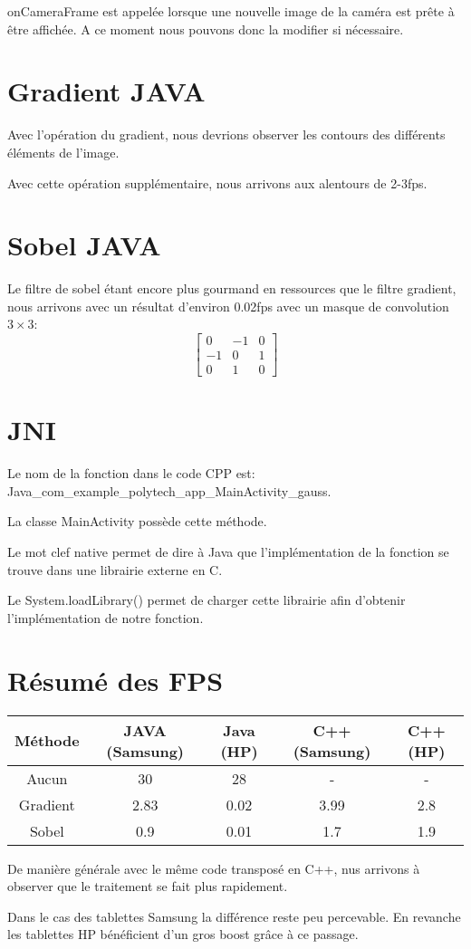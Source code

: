 \documentclass{report}
\begin{document}
				onCameraFrame est appelée lorsque une nouvelle image de la caméra est prête à être affichée.
				A ce moment nous pouvons donc la modifier si nécessaire.
		\section{Gradient JAVA}
			Avec l'opération du gradient, nous devrions observer les contours des différents éléments de l'image.
			
			Avec cette opération supplémentaire, nous arrivons aux alentours de 2-3fps.
			
		\section{Sobel JAVA}
			Le filtre de sobel étant encore plus gourmand en ressources que le filtre gradient, nous arrivons avec un résultat d'environ 0.02fps avec un masque de convolution $3\times 3$:
			$$\begin{bmatrix}
				0 & -1 & 0\\
				-1 & 0 & 1\\
				0 & 1 & 0
			\end{bmatrix}$$
		
		\section{JNI}
			Le nom de la fonction dans le code CPP est: Java\_com\_example\_polytech\_app\_MainActivity\_gauss.
			
			La classe MainActivity possède cette méthode.
			
			Le mot clef native permet de dire à Java que l'implémentation de la fonction se trouve dans une librairie externe en C.
			
			Le System.loadLibrary() permet de charger cette librairie afin d'obtenir l'implémentation de notre fonction.
			
		\section{Résumé des FPS}
			\begin{tabular}{|c|c|c|c|c|}
				\hline
				Méthode & JAVA (Samsung) & Java (HP) & C++ (Samsung) & C++ (HP)\\\hline
				Aucun & 30 & 28 & - & -\\\hline
				Gradient & 2.83 & 0.02 & 3.99 & 2.8\\\hline
				Sobel & 0.9 & 0.01 & 1.7 & 1.9\\\hline
			\end{tabular}
			
			De manière générale avec le même code transposé en C++, nus arrivons à observer que le traitement se fait plus rapidement.
			
			Dans le cas des tablettes Samsung la différence reste peu percevable.
			En revanche les tablettes HP bénéficient d'un gros boost grâce à ce passage.
\end{document}

